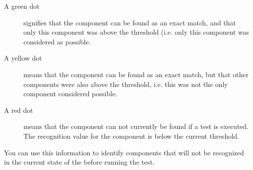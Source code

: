 \begin{description}
\item [A green dot]{signifies that the component can be found as an exact match, and that only this component was above the threshold  (i.e. only this component was considered as possible.}
\item [A yellow dot]{means that the component can be found as an exact match, but that other components were also above the threshold, i.e. this was not the only component considered possible.}
\item [A red dot]{means that the component can not currently be found if a test is executed. The recognition value for the component is below the current threshold.}
\end{description}

You can use this information to identify components that will not be recognized in the current state of the \gdaut{} before running the test. 

